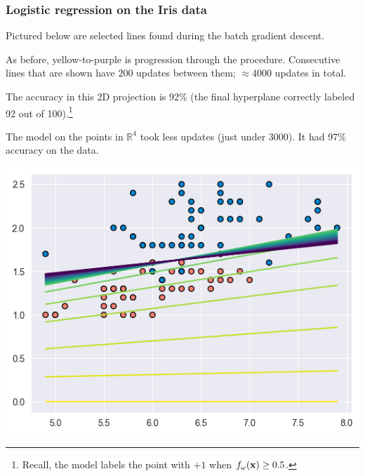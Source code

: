 \documentclass{beamer}
\theoremstyle{example}
\begin{document}
\begin{frame}
    \frametitle{Logistic regression on the Iris data}
    Pictured below are selected lines found during the batch gradient descent. 
    
    As before, yellow-to-purple is progression through the procedure. Consecutive lines that are shown have $200$ updates between them; $\approx 4000$ updates in total.

    The accuracy in this 2D projection is 92\% (the final hyperplane correctly labeled 92 out of 100).\footnote{Recall, the model labels the point with $+1$ when $f_{\omega}({\bf x}) \ge 0.5$.}

    The model on the points in $\mathbb R^4$ took less updates (just under $3000$). It had 97\% accuracy on the data.

    \centering
    \includegraphics[height=0.35\textheight]{../../Images/GDon2DIrisData.png}
\end{frame}
\end{document}
